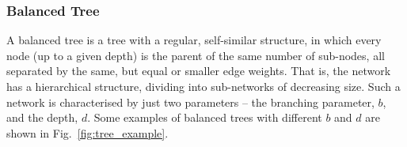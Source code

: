 \documentclass[aps,rmp,twocolumn,amsmath,amssymb,nofootinbib,superscriptaddress]{revtex4}
\begin{document}
%
%

\subsubsection{Balanced Tree} \label{sec:bal_tree}

A balanced tree is a tree with a regular, self-similar structure, in which every node (up to a given depth) is the parent of the same number of sub-nodes, all separated by the same, but equal or smaller edge weights. That is, the network has a hierarchical structure, dividing into sub-networks of decreasing size. Such a network is characterised by just two parameters -- the branching parameter, $b$, and the depth, $d$. Some examples of balanced trees with different $b$ and $d$ are shown in Fig.~\ref{fig:tree_example}.
\end{document}
